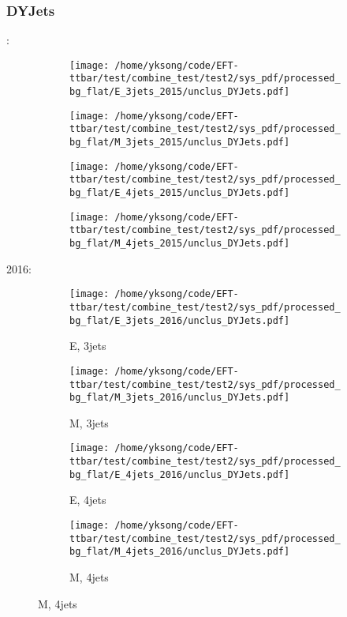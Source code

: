 \documentclass{beamer}
\begin{document}
\begin{frame}
\frametitle{DYJets}
\fontsize{5}{1}:
\begin{figure}
\centering
\begin{subfigure}[b]{0.24\textwidth}
\texttt{[image: /home/yksong/code/EFT-ttbar/test/combine\_test/test2/sys\_pdf/processed\_bg\_flat/E\_3jets\_2015/unclus\_DYJets.pdf]}
\end{subfigure}
\begin{subfigure}[b]{0.24\textwidth}
\texttt{[image: /home/yksong/code/EFT-ttbar/test/combine\_test/test2/sys\_pdf/processed\_bg\_flat/M\_3jets\_2015/unclus\_DYJets.pdf]}
\end{subfigure}
\begin{subfigure}[b]{0.24\textwidth}
\texttt{[image: /home/yksong/code/EFT-ttbar/test/combine\_test/test2/sys\_pdf/processed\_bg\_flat/E\_4jets\_2015/unclus\_DYJets.pdf]}
\end{subfigure}
\begin{subfigure}[b]{0.24\textwidth}
\texttt{[image: /home/yksong/code/EFT-ttbar/test/combine\_test/test2/sys\_pdf/processed\_bg\_flat/M\_4jets\_2015/unclus\_DYJets.pdf]}
\end{subfigure}
\end{figure}
2016:
\begin{figure}
\centering
\begin{subfigure}[b]{0.24\textwidth}
\texttt{[image: /home/yksong/code/EFT-ttbar/test/combine\_test/test2/sys\_pdf/processed\_bg\_flat/E\_3jets\_2016/unclus\_DYJets.pdf]}
\captionsetup{font=tiny}
\caption{E, 3jets}
\end{subfigure}
\begin{subfigure}[b]{0.24\textwidth}
\texttt{[image: /home/yksong/code/EFT-ttbar/test/combine\_test/test2/sys\_pdf/processed\_bg\_flat/M\_3jets\_2016/unclus\_DYJets.pdf]}
\captionsetup{font=tiny}
\caption{M, 3jets}
\end{subfigure}
\begin{subfigure}[b]{0.24\textwidth}
\texttt{[image: /home/yksong/code/EFT-ttbar/test/combine\_test/test2/sys\_pdf/processed\_bg\_flat/E\_4jets\_2016/unclus\_DYJets.pdf]}
\captionsetup{font=tiny}
\caption{E, 4jets}
\end{subfigure}
\begin{subfigure}[b]{0.24\textwidth}
\texttt{[image: /home/yksong/code/EFT-ttbar/test/combine\_test/test2/sys\_pdf/processed\_bg\_flat/M\_4jets\_2016/unclus\_DYJets.pdf]}
\captionsetup{font=tiny}
\caption{M, 4jets}
\end{subfigure}
\end{figure}
\end{frame}
\end{document}
